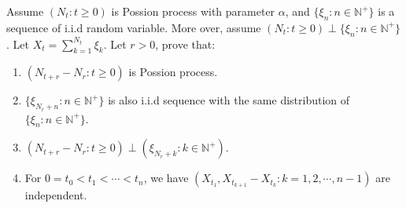 \documentclass{ctexart}
\newif\ifpreface
\begin{document}
\large
\iffalse
  \setlength{\baselineskip}{1.2em}
  \ifpreface
    
  \else
    \maketitle
  \fi
\fi
{}
\begin{problem}\label{pro:1}
  Assume \((N_t:t \geq 0)\) is Possion process with parameter \(\alpha\), and \(\{\xi_n:n \in  \mathbb{N}^+\}\) is a sequence of i.i.d random variable.
  More over, assume \((N_t:t \geq 0) \perp \{\xi_n:n \in \mathbb{N}^+\}\).
  Let \(X_t=\sum_{k=1}^{N_t} \xi_k\).
  Let \(r>0\), prove that:
  \begin{enumerate}
    \item \((N_{t+r}-N_r:t \geq 0)\) is Possion process.
    \item \label{it:1.2}\(\{\xi_{N_r+n}:n \in \mathbb{N}^+\}\) is also i.i.d sequence with the same distribution of \(\{\xi_n:n \in \mathbb{N}^+\}\).
    \item \((N_{t + r}-N_r:t \geq 0)\perp (\xi_{N_r + k}:k \in \mathbb{N}^+)\).
    \item For \(0=t_0<t_1<\cdots<t_n\), we have \((X_{t_1},X_{t_{k+1}}-X_{t_k}:k=1,2,\cdots,n-1)\) are independent.
  \end{enumerate}
\end{problem}
\end{document}
